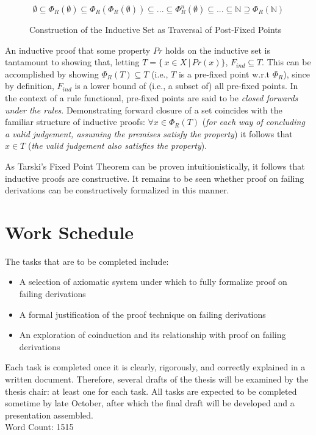 \documentclass[titlepage]{article}
\begin{document}
\begin{figure}[h]
\caption{Construction of the Inductive Set as Traversal of Post-Fixed Points}
\label{ind-construction}

$$\emptyset \subseteq \Phi_R(\emptyset) \subseteq \Phi_R(\Phi_R(\emptyset)) \subseteq ... \subseteq \Phi_R^n(\emptyset) \subseteq ... \subseteq \mathbb{N} \supseteq \Phi_R(\mathbb{N})$$

\end{figure}

An inductive proof that some property $Pr$ holds on the inductive set is tantamount to showing that, letting $T = \{\, x \in X \,|\, Pr(x)\}$, $F_{ind} \subseteq T$. This can be accomplished by showing $\Phi_R(T) \subseteq T$ (i.e., $T$ is a pre-fixed point w.r.t $\Phi_R$), since by definition, $F_{ind}$ is a lower bound of (i.e., a subset of) all pre-fixed points. In the context of a rule functional, pre-fixed points are said to be \textit{closed forwards under the rules}. Demonstrating forward closure of a set coincides with the familiar structure of inductive proofs: $\forall x \in \Phi_R(T)$ (\textit{for each way of concluding a valid judgement, assuming the premises satisfy the property}) it follows that $x \in T$ (\textit{the valid judgement also satisfies the property}).

As Tarski's Fixed Point Theorem can be proven intuitionistically, it follows that inductive proofs are constructive. It remains to be seen whether proof on failing derivations can be constructively formalized in this manner.

\section{Work Schedule}
The tasks that are to be completed include:
\begin{itemize}
  \item A selection of axiomatic system under which to fully formalize proof on failing derivations
  \item A formal justification of the proof technique on failing derivations 
  \item An exploration of coinduction and its relationship with proof on failing derivations
\end{itemize}

Each task is completed once it is clearly, rigorously, and correctly explained in a written document. Therefore, several drafts of the thesis will be examined by the thesis chair: at least one for each task. All tasks are expected to be completed sometime by late October, after which the final draft will be developed and a presentation assembled.\\

Word Count: 1515


{}
\end{document}
